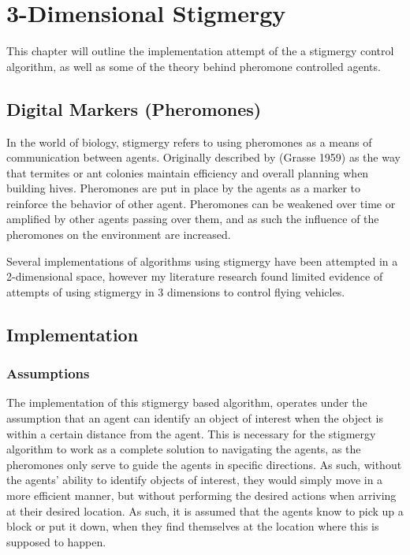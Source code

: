 
\chapter{3-Dimensional Stigmergy}
\label{chap:stigmergy}

This chapter will outline the implementation attempt of the a stigmergy control algorithm, as well as some of the theory behind pheromone controlled agents. 
 
\section{Digital Markers (Pheromones)}
In the world of biology, stigmergy refers to using pheromones as a means of communication between agents. Originally described by (Grasse 1959)\cite{holland_stigmergy_1999}  as the way that termites or ant colonies maintain efficiency and overall planning when building hives. Pheromones are put in place by the agents as a marker to reinforce the behavior of other agent. Pheromones can be weakened over time or amplified by other agents passing over them, and as such the influence of the pheromones on the environment are increased.

Several implementations of algorithms using stigmergy have been attempted in a 2-dimensional space, however my literature research found limited evidence of attempts of using stigmergy in 3 dimensions to control flying vehicles. 

\section{Implementation}
\label{stigmergy:impl}

\subsection{Assumptions}
The implementation of this stigmergy based algorithm, operates under the assumption that an agent can identify an object of interest when the object is within a certain distance from the agent. This is necessary for the stigmergy algorithm to work as a complete solution to navigating the agents, as the pheromones only serve to guide the agents in specific directions. As such, without the agents' ability to identify objects of interest, they would simply move in a more efficient manner, but without performing the desired actions when arriving at their desired location. As such, it is assumed that the agents know to pick up a block or put it down, when they find themselves at the location where this is supposed to happen. 

